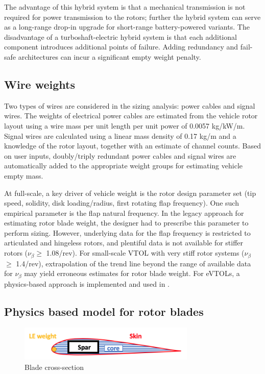 The advantage of this hybrid system is that a mechanical transmission is not required for power transmission to the rotors; further the hybrid system can serve as a long-range drop-in upgrade for short-range battery-powered variants. The disadvantage of a turboshaft-electric hybrid system is that each additional component introduces additional points of failure. Adding redundancy and fail-safe architectures can incur a significant empty weight penalty.

\subsection{Wire weights}
Two types of wires are considered in the sizing analysis: power cables and signal wires. The weights of electrical power cables are estimated from the vehicle rotor layout using a wire mass per unit length per unit power of 0.0057 kg/kW/m. Signal wires are calculated using a linear mass density of 0.17 kg/m and a knowledge of the rotor layout, together with an estimate of channel counts. Based on user inputs, doubly/triply redundant power cables and signal wires are automatically added to the appropriate weight groups for estimating vehicle empty mass.

At full-scale, a key driver of vehicle weight is the rotor design parameter set (tip speed, solidity, disk loading/radius, first rotating flap frequency). One such empirical parameter is the flap natural frequency. In the legacy approach for estimating rotor blade weight, the designer had to prescribe this parameter to perform sizing. However, underlying data for the flap frequency is restricted to articulated and hingeless rotors, and plentiful data is not available for stiffer rotors ($\nu_\beta \geq$ 1.08/rev). For small-scale VTOL with very stiff rotor systems ($\nu_\beta$ $\geq$ 1.4/rev), extrapolation of the trend line beyond the range of available data for $\nu_\beta$ may yield erroneous estimates for rotor blade weight. For eVTOLs, a physics-based approach is implemented and used in \hydra.

\subsection{Physics based model for rotor blades}

\begin{figure}
\begin{center}
\includegraphics[width=0.75\textwidth]{images/cross_section.png}
\vspace{-0.1cm}
\caption{Blade cross-section}
\label{fig:cross_section}
\end{center}
\end{figure}

